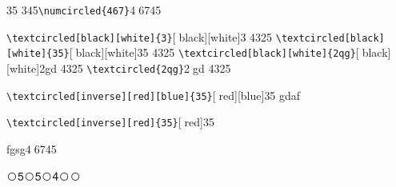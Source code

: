 \documentclass{article}
\begin{document}
35 345\verb|\numcircled{467}|\textcircled{467}45

 \verb|\textcircled[black][white]{3}|\textcircled[black][white]{3} 4325
   \verb|\textcircled[black][white]{35}|\textcircled[black][white]{35} 4325
  \verb|\textcircled[black][white]{2qg}|\textcircled[black][white]{2gd} 4325
    \verb|\textcircled{2qg}|\textcircled{2gd} 4325
 
  \verb|\textcircled[inverse][red][blue]{35}|\textcircled[red][blue]{35} gdaf
  
   \verb|\textcircled[inverse][red]{35}|\textcircled[red]{35}

fgsg\textcircled{467}45
   
\newcommand{\wcnt}{\textcircled{\themycnt}}

\wcnt5\wcnt5\wcnt4\wcnt\wcnt
\end{document}

